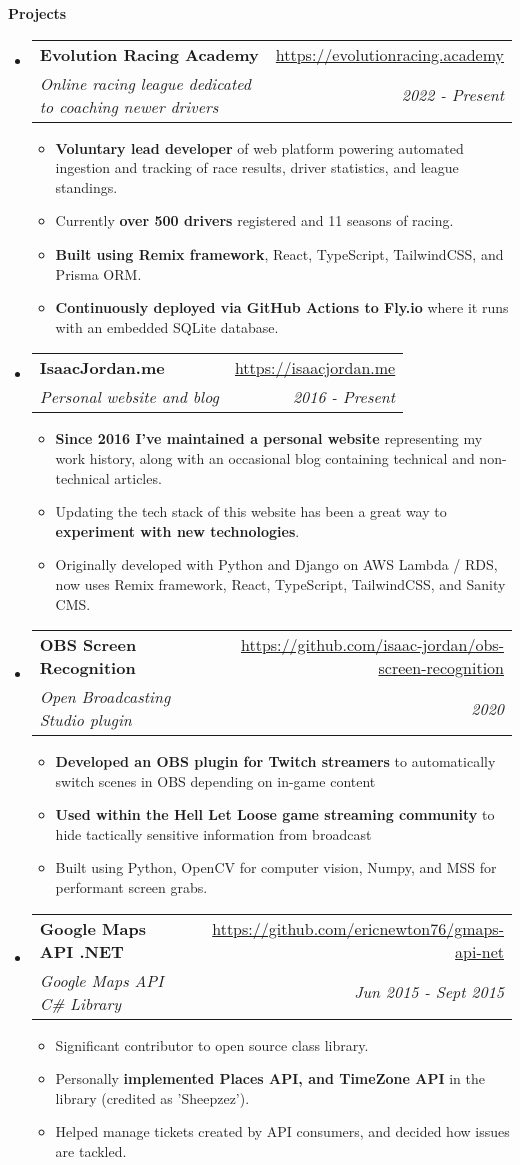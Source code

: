 \documentclass[letterpaper,11pt]{article}
\makeatletter
\newcommand{\resitem}[1]{\item #1 \vspace{-1pt}}
\newcommand{\resheading}[1]{{\large \colorbox{mygrey}{\begin{minipage}{\textwidth}{\textbf{#1 \vphantom{p\^{E}}}}\end{minipage}}}}
\newcommand{\ressubheading}[4]{
\begin{tabular*}{7.0in}{l@{\extracolsep{\fill}}r}
	\textbf{#1} & #2 \\
	\textit{#3} & \textit{#4} \\
\end{tabular*}\vspace{-6pt}}
\makeatother
\begin{document}
\resheading{Projects}
\begin{itemize}
	\item
		\ressubheading{Evolution Racing Academy}{\url{https://evolutionracing.academy}}
		{Online racing league dedicated to coaching newer drivers}{2022 - Present}
		\begin{itemize}
			\resitem{\textbf{Voluntary lead developer} of web platform powering automated ingestion and tracking of race results, driver statistics, and league standings.}
			\resitem{Currently \textbf{over 500 drivers} registered and 11 seasons of racing.}
			\resitem{\textbf{Built using Remix framework}, React, TypeScript, TailwindCSS, and Prisma ORM.}
			\resitem{\textbf{Continuously deployed via GitHub Actions to Fly.io} where it runs with an embedded SQLite database.}
		\end{itemize}

	\item
		\ressubheading{IsaacJordan.me}{\url{https://isaacjordan.me}}
		{Personal website and blog}{2016 - Present}
		\begin{itemize}
			\resitem{\textbf{Since 2016 I've maintained a personal website} representing my work history, along with an occasional blog containing technical and non-technical articles.}
			\resitem{Updating the tech stack of this website has been a great way to \textbf{experiment with new technologies}.}
			\resitem{Originally developed with Python and Django on AWS Lambda / RDS, now uses Remix framework, React, TypeScript, TailwindCSS, and Sanity CMS.}
		\end{itemize}

	\item
		\ressubheading{OBS Screen Recognition}{\url{https://github.com/isaac-jordan/obs-screen-recognition}}
		{Open Broadcasting Studio plugin}{2020}
		\begin{itemize}
			\resitem{\textbf{Developed an OBS plugin for Twitch streamers} to automatically switch scenes in OBS depending on in-game content}
			\resitem{\textbf{Used within the Hell Let Loose game streaming community} to hide tactically sensitive information from broadcast}
			\resitem{Built using Python, OpenCV for computer vision, Numpy, and MSS for performant screen grabs.}
		\end{itemize}

	\item
		\ressubheading{Google Maps API .NET}{\url{https://github.com/ericnewton76/gmaps-api-net}}
		{Google Maps API C\# Library}{Jun 2015 - Sept 2015}
		\begin{itemize}
			\resitem{Significant contributor to open source class library.}
			\resitem{Personally \textbf{implemented Places API, and TimeZone API} in the library (credited as 'Sheepzez').}
			\resitem{Helped manage tickets created by API consumers, and decided how issues are tackled.}
		\end{itemize}

\end{itemize}
\end{document}

